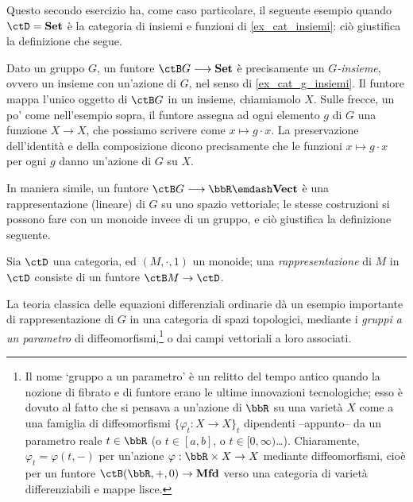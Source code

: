 Questo secondo esercizio ha, come caso particolare, il seguente esempio quando \(\ctD=\ctSet\) è la categoria di insiemi e funzioni di \ref{ex_cat_insiemi}: ciò giustifica la definizione che segue.
\begin{example}\label{exa_azioni_funtori}
	Dato un gruppo \(G\), un funtore \(\ctB G\fun\ctSet\) è precisamente un \emph{\(G\)-insieme}, ovvero un insieme con un'azione di \(G\), nel senso di \ref{ex_cat_g_insiemi}.
	Il funtore mappa l'unico oggetto di \(\ctB G\) in un insieme, chiamiamolo \(X\).
	Sulle frecce, un po' come nell'esempio sopra, il funtore assegna ad ogni elemento \(g\) di \(G\) una funzione \(X\to X\), che possiamo scrivere come \(x\mapsto g\cdot x\).
	La preservazione dell'identità e della composizione dicono precisamente che le funzioni \(x\mapsto g\cdot x\) per ogni \(g\) danno un'azione di \(G\) su \(X\).

\end{example}
In maniera simile, un funtore \(\ctB G\fun\bbR\emdash\ctVect\) è una rappresentazione (lineare) di \(G\) su uno spazio vettoriale; le stesse costruzioni si possono fare con un monoide invece di un gruppo, e ciò giustifica la definizione seguente.
\begin{definition}[Rappresentazione di \(M\)]
	Sia \(\ctD\) una categoria, ed \((M,\cdot,1)\) un monoide; una \emph{rappresentazione} di \(M\) in \(\ctD\) consiste di un funtore \(\ctB M \to \ctD\).
\end{definition}
La teoria classica delle equazioni differenziali ordinarie dà un esempio importante di rappresentazione di $G$ in una categoria di spazi topologici, mediante i \emph{gruppi a un parametro} di diffeomorfismi,\footnote{Il nome `gruppo a un parametro' è un relitto del tempo antico quando la nozione di fibrato e di funtore erano le ultime innovazioni tecnologiche; esso è dovuto al fatto che si pensava a un'azione di $\bbR$ su una varietà $X$ come a una famiglia di diffeomorfismi $\{\varphi_t : X\to X\}_t$ dipendenti --appunto-- da un parametro reale $t\in\bbR$ (o $t\in [a,b]$, o $t\in [0,\infty)$\dots). Chiaramente, $\varphi_t = \varphi(t,-)$ per un'azione $\varphi : \bbR\times X\to X$ mediante diffeomorfismi, cioè per un funtore $\ctB(\bbR,+,0)\to\cate{Mfd}$ verso una categoria di varietà differenziabili e mappe lisce.} o dai campi vettoriali a loro associati.
